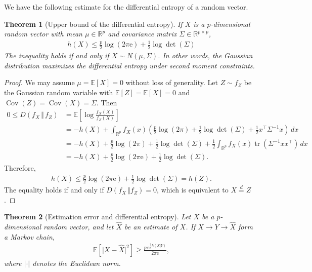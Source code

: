 \documentclass{article}
\numberwithin{equation}{section}
\newcommand{\e}{\mathrm{e}}
\newcommand{\E}{\mathbb{E}}
\newcommand{\bbR}{\mathbb{R}}
\newcommand{\wh}{\widehat}
\DeclareMathOperator{\tr}{tr}
\DeclareMathOperator{\cov}{Cov}
\theoremstyle{plain}
\newtheorem{theorem}{Theorem}[section]
\theoremstyle{definition}
\begin{document}
We have the following estimate for the differential entropy of a random vector.
\begin{theorem}[Upper bound of the differential entropy]\label{gaussmaxdiffent}
If $X$ is a $p$-dimensional random vector with mean $\mu\in\bbR^p$ and covariance matrix $\Sigma\in\bbR^{p\times p}$,
\begin{align*}
	h(X)\leq \frac{p}{2}\log(2\pi\e)+\frac{1}{2}\log\det(\Sigma)
\end{align*}
The inequality holds if and only if $X\sim N(\mu,\Sigma)$. In other words, the Gaussian distribution maximizes the differential entropy under second moment constraints.
\end{theorem}
\begin{proof}
We may assume $\mu=\E[X]=0$ without loss of generality. Let $Z\sim f_Z$ be the Gaussian random variable with $\E[Z]=\E[X]=0$ and $\cov(Z)=\cov(X)=\Sigma$. Then
\begin{align*}
0\leq D(f_X\,\Vert\,f_Z)&=\E\left[\log\frac{f_X(X)}{f_Z(X)}\right]\\
&=-h(X)+\int_{\bbR^p}f_X(x)\left(\frac{p}{2}\log(2\pi)+\frac{1}{2}\log\det(\Sigma)+\frac{1}{2}x^\top\Sigma^{-1} x\right)\,dx\\
&=-h(X)+\frac{p}{2}\log(2\pi)+\frac{1}{2}\log\det(\Sigma)+\frac{1}{2}\int_{\bbR^p}f_X(x)\tr\left(\Sigma^{-1}xx^\top\right)\,dx\\
&=-h(X)+\frac{p}{2}\log(2\pi\e)+\frac{1}{2}\log\det(\Sigma).
\end{align*}
Therefore,
\begin{align*}
	h(X)\leq\frac{p}{2}\log(2\pi\e)+\frac{1}{2}\log\det(\Sigma)= h(Z).
\end{align*}
The equality holds if and only if $D(f_X\,\Vert f_Z)=0$, which is equivalent to $X\overset{d}{=}Z$.
\end{proof}
\begin{theorem}[Estimation error and differential entropy]
Let $X$ be a $p$-dimensional random vector, and let $\wh{X}$ be an estimate of $X$. If $X\to Y\to\wh{X}$ form a Markov chain, 
\begin{align*}
	\E\left[\bigl\vert X-\wh{X}\bigr\vert^2\right]\geq\frac{p\,\e^{\frac{2}{p}h(X|Y)}}{2\pi\e},
\end{align*}
where $\vert\cdot\vert$ denotes the Euclidean norm.
\end{theorem}
\end{document}
